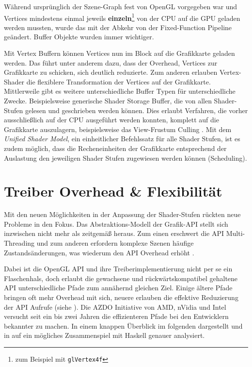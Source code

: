 Während ursprünglich der Szene-Graph fest von OpenGL vorgegeben war und Vertices mindestens einmal jeweils \textbf{einzeln}\footnote{ zum Beispiel mit \texttt{glVertex4f}} von der CPU auf die GPU geladen werden mussten, wurde das mit der Abkehr von der Fixed-Function Pipeline geändert. Buffer Objekte wurden immer wichtiger.

Mit Vertex Buffern können Vertices nun im Block auf die Grafikkarte geladen werden. Das führt unter anderem dazu, dass der Overhead, Vertices zur Grafikkarte zu schicken, sich deutlich reduzierte. Zum anderen erlauben Vertex-Shader die flexiblere Transformation der Vertices auf der Grafikkarte. Mittlerweile gibt es weitere unterschiedliche Buffer Typen für unterschiedliche Zwecke. Beispielsweise generische Shader Storage Buffer, die von allen Shader-Stufen gelesen und geschrieben werden können. Dies erlaubt Verfahren, die vorher ausschließlich auf der CPU ausgeführt werden konnten, komplett auf die Grafikkarte auszulagern, beispielsweise das View-Frustum Culling \parencite{Barczak2008}. Mit dem \textit{Unified Shader Model}, ein einheitlicher Befehlssatz für alle Shader Stufen, ist es zudem möglich, dass die Recheneinheiten der Grafikkarte entsprechend der Auslastung den jeweiligen Shader Stufen zugewiesen werden können (Scheduling).

\section{Treiber Overhead \& Flexibilität}
\label{sec:overhead-und-flexibilitaet}

Mit den neuen Möglichkeiten in der Anpassung der Shader-Stufen rückten neue Probleme in den Fokus. Das Abstraktions-Modell der Grafik-\ac{API} stellt sich inzwischen nicht mehr als zeitgemäß heraus. Zum einen erschwert die \ac{API} Multi-Threading und zum anderen erfordern komplexe Szenen häufige Zustandsänderungen, was wiederum den \ac{API} Overhead erhöht \parencite[Seite 8]{Everitt2014a}.

Dabei ist die OpenGL API und ihre Treiberimplementierung nicht per se ein Flaschenhals, doch erlaubt die gewachsene und rückwärtskompatibel gehaltene API unterschiedliche Pfade zum annähernd gleichen Ziel. Einige ältere Pfade bringen oft mehr Overhead mit sich, neuere erlauben die effektive Reduzierung der API Aufrufe (siehe ). Die \ac{AZDO} Initiative von AMD, nVidia und Intel versucht seit ein bis zwei Jahren die effizienteren Pfade bei den Entwicklern bekannter zu machen. In einem knappen Überblick im folgenden dargestellt und in  auf ein mögliches Zusammenspiel mit Haskell genauer analysiert.

